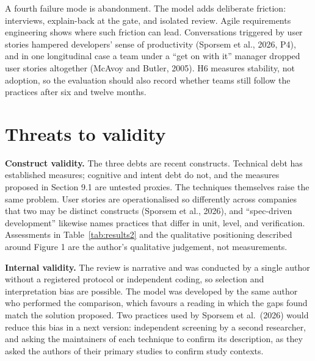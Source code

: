 \documentclass[11pt]{article}
\begin{document}
A fourth failure mode is abandonment. The model adds deliberate friction: interviews, explain-back at the gate, and isolated review. Agile requirements engineering shows where such friction can lead. Conversations triggered by user stories hampered developers' sense of productivity (Sporsem et al., 2026, P4), and in one longitudinal case a team under a ``get on with it'' manager dropped user stories altogether (McAvoy and Butler, 2005). H6 measures stability, not adoption, so the evaluation should also record whether teams still follow the practices after six and twelve months.

\section{Threats to validity}

\textbf{Construct validity.} The three debts are recent constructs. Technical debt has established measures; cognitive and intent debt do not, and the measures proposed in Section 9.1 are untested proxies. The techniques themselves raise the same problem. User stories are operationalised so differently across companies that two may be distinct constructs (Sporsem et al., 2026), and ``spec-driven development'' likewise names practices that differ in unit, level, and verification. Assessments in Table~\ref{tab:results2} and the qualitative positioning described around Figure 1 are the author's qualitative judgement, not measurements.

\textbf{Internal validity.} The review is narrative and was conducted by a single author without a registered protocol or independent coding, so selection and interpretation bias are possible. The model was developed by the same author who performed the comparison, which favours a reading in which the gaps found match the solution proposed. Two practices used by Sporsem et al.\ (2026) would reduce this bias in a next version: independent screening by a second researcher, and asking the maintainers of each technique to confirm its description, as they asked the authors of their primary studies to confirm study contexts.
\end{document}
